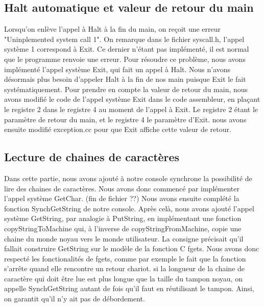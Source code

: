 \documentclass[12pt]{article}
\begin{document}
\bigbreak
\subsection{Halt automatique et valeur de retour du main}
Lorsqu'on enlève l'appel à \textcolor{blue2}{Halt} à la fin du main, on reçoit une erreur "Uninplemented system call 1". On remarque dans le fichier \textcolor{vert2}{syscall.h}, l'appel système 1 correspond à \textcolor{blue2}{Exit}. Ce dernier n'étant pas implémenté, il est normal que le programme renvoie une erreur. Pour résoudre ce problème, nous avons implémenté l'appel système \textcolor{blue2}{Exit}, qui fait un appel à \textcolor{blue2}{Halt}. Nous n'avons désormais plus besoin d'appeler \textcolor{blue2}{Halt} à la fin de nos main puisque \textcolor{blue2}{Exit} le fait systématiquement.
\newline
Pour prendre en compte la valeur de retour du main, nous avons modifié le code de l'appel système \textcolor{blue2}{Exit} dans le code assembleur, en plaçant le registre 2 dans le registre 4 au moment de l'appel à \textcolor{blue2}{Exit}. Le registre 2 étant le paramètre de retour du main, et le registre 4 le paramètre d'\textcolor{blue2}{Exit}. nous avons ensuite modifié exception.cc pour que \textcolor{blue2}{Exit} affiche cette valeur de retour.

\bigbreak
\subsection{Lecture de chaines de caractères}
Dans cette partie, nous avons ajouté à notre console synchrone la possibilité de lire des chaines de caractères. Nous avons donc commencé par implémenter l'appel système \textcolor{blue2}{GetChar}. (fin de fichier ??) Nous avons ensuite complété la fonction \textcolor{red2}{SynchGetString} de notre console. Après celà, nous avons ajouté l'appel système \textcolor{blue2}{GetString}, par analogie à \textcolor{blue2}{PutString}, en implémentant une fonction \textcolor{red2}{copyStringToMachine} qui, à l'inverse de \textcolor{red2}{copyStringFromMachine}, copie une chaine du monde noyau vers le monde utilisateur.
\newline
La consigne précisait qu'il fallait construire \textcolor{blue2}{GetString} sur le modèle de la fonction C \textcolor{red2}{fgets}. Nous avons donc respecté les fonctionalités de \textcolor{red2}{fgets}, comme par exemple le fait que la fonction s'arrête quand elle rencontre un retour chariot. si la longueur de la chaine de caractère qui doit être lue est plus longue que la taille du tampon noyau, on appelle \textcolor{red2}{SynchGetString} autant de fois qu'il faut en réutilisant le tampon. Ainsi, on garantit qu'il n'y ait pas de débordement.
\end{document}
